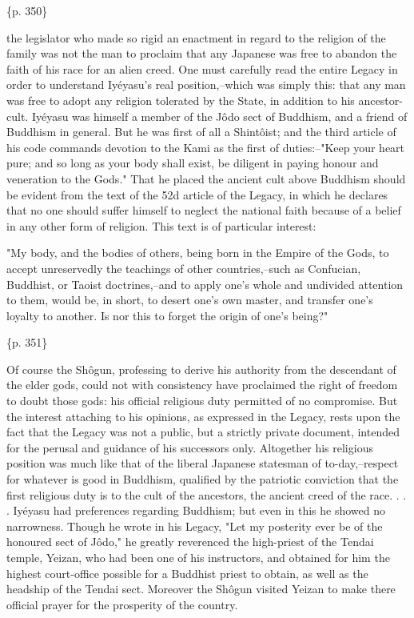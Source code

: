 \{p. 350\}

the legislator who made so rigid an enactment in regard to the religion of the family was not the man to proclaim that any Japanese was free to abandon the faith of his race for an alien creed. One must carefully read the entire Legacy in order to understand Iyéyasu's real position,--which was simply this: that any man was free to adopt any religion tolerated by the State, in addition to his ancestor-cult. Iyéyasu was himself a member of the Jôdo sect of Buddhism, and a friend of Buddhism in general. But he was first of all a Shintôist; and the third article of his code commands devotion to the Kami as the first of duties:--"Keep your heart pure; and so long as your body shall exist, be diligent in paying honour and veneration to the Gods." That he placed the ancient cult above Buddhism should be evident from the text of the 52d article of the Legacy, in which he declares that no one should suffer himself to neglect the national faith because of a belief in any other form of religion. This text is of particular interest:

"My body, and the bodies of others, being born in the Empire of the Gods, to accept unreservedly the teachings of other countries,--such as Confucian, Buddhist, or Taoist doctrines,--and to apply one's whole and undivided attention to them, would be, in short, to desert one's own master, and transfer one's loyalty to another. Is nor this to forget the origin of one's being?"

\{p. 351\}

Of course the Shôgun, professing to derive his authority from the descendant of the elder gods, could not with consistency have proclaimed the right of freedom to doubt those gods: his official religious duty permitted of no compromise. But the interest attaching to his opinions, as expressed in the Legacy, rests upon the fact that the Legacy was not a public, but a strictly private document, intended for the perusal and guidance of his successors only. Altogether his religious position was much like that of the liberal Japanese statesman of to-day,--respect for whatever is good in Buddhism, qualified by the patriotic conviction that the first religious duty is to the cult of the ancestors, the ancient creed of the race. . . . Iyéyasu had preferences regarding Buddhism; but even in this he showed no narrowness. Though he wrote in his Legacy, "Let my posterity ever be of the honoured sect of Jôdo," he greatly reverenced the high-priest of the Tendai temple, Yeizan, who had been one of his instructors, and obtained for him the highest court-office possible for a Buddhist priest to obtain, as well as the headship of the Tendai sect. Moreover the Shôgun visited Yeizan to make there official prayer for the prosperity of the country.



